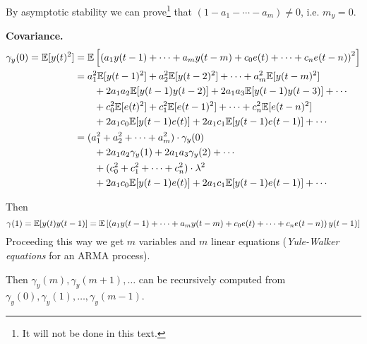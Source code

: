 By asymptotic stability we can prove\footnote{It will not be done in this text.} that $(1-a_1-\cdots-a_m)\neq 0$, i.e. $m_{y}=0$.

\textbf{Covariance.}
\begin{align*}
	\gamma_{y}(0) = \mathbb{E}[y(t)^{2}] &= \mathbb{E}\left[\left(a_{1} y(t-1) + \cdots + a_{m} y(t-m) + c_{0} e(t) + \cdots + c_{n} e(t-n)\right)^{2}\right]\\
	&= a_{1}^{2} \mathbb{E}[y(t-1)^{2}] + a_{2}^{2} \mathbb{E}[y(t-2)^{2}] + \cdots+a_{m}^{2} \mathbb{E}[y(t-m)^{2}]\\
	&\qquad + 2 a_{1} a_{2} \mathbb{E}[y(t-1) y(t-2)] + 2 a_{1} a_{3} \mathbb{E}[y(t-1) y(t-3)] + \cdots \\
	&\qquad + c_{0}^{2} \mathbb{E}[e(t)^{2}] + c_{1}^2 \mathbb{E}[e(t-1)^2] + \cdots+c_{n}^2 \mathbb{E}[e(t-n)^2]\\
	&\qquad + 2 a_{1} c_{0} \mathbb{E}[y(t-1) e(t)] + 2 a_{1} c_{1} \mathbb{E}[y(t-1) e(t-1)] + \cdots\\
	&= (a_{1}^{2} + a_{2}^{2} + \cdots+a_{m}^{2})\cdot\gamma_{y}(0)\\
	&\qquad + 2 a_{1} a_{2} \gamma_{y}(1) + 2 a_{1} a_{3} \gamma_{y}(2) + \cdots \\
	&\qquad + (c_{0}^{2} + c_{1}^2 + \cdots+c_{n}^2)\cdot\lambda^2\\
	&\qquad + 2 a_{1} c_{0} \mathbb{E}[y(t-1) e(t)] + 2 a_{1} c_{1} \mathbb{E}[y(t-1) e(t-1)] + \cdots\\
\end{align*}

Then
\[
	\gamma (1)=\mathbb{E}[y(t) y(t-1)] = \mathbb{E}\left[\left(a_{1} y(t-1)+\cdots+a_{m} y(t-m)+c_{0} e(t)+\cdots+c_{n} e(t-n)\right) y(t-1)\right]
\]
Proceeding this way we get $m$ variables and $m$ linear equations (\emph{Yule-Walker equations} for an ARMA process).

Then $\gamma_{y}(m), \gamma_{y}(m+1), \ldots$ can be recursively computed from $\gamma_{y}(0), \gamma_{y}(1), \ldots, \gamma_{y}(m-1)$.